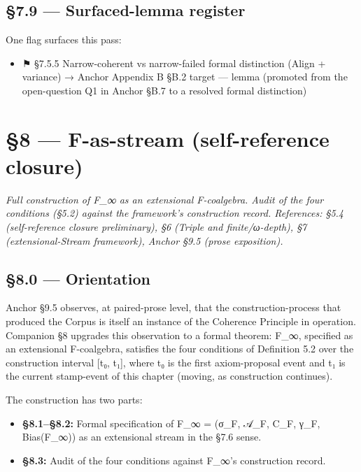 \documentclass[11pt, openany]{book}
\newcommand{\sectionbreak}{\clearpage}
\begin{document}
\sectionbreak

\section{§7.9 --- Surfaced-lemma register}

One flag surfaces this pass:

\begin{itemize}
\item ⚑ §7.5.5 Narrow-coherent vs narrow-failed formal distinction (Align + variance) → Anchor Appendix B §B.2 target --- lemma (promoted from the open-question Q1 in Anchor §B.7 to a resolved formal distinction)
\end{itemize}

\sectionbreak


\chapter{§8 — F-as-stream (self-reference closure)}


\textit{Full construction of F\_\allowbreak{}∞ as an extensional F-coalgebra. Audit of the four conditions (§5.2) against the framework's construction record. References: §5.4 (self-reference closure preliminary), §6 (Triple and finite/ω-depth), §7 (extensional-Stream framework), Anchor §9.5 (prose exposition).}

\sectionbreak

\section{§8.0 --- Orientation}

Anchor §9.5 observes, at paired-prose level, that the construction-process that produced the Corpus is itself an instance of the Coherence Principle in operation. Companion §8 upgrades this observation to a formal theorem: F\_\allowbreak{}∞, specified as an extensional F-coalgebra, satisfies the four conditions of Definition 5.2 over the construction interval [t₀, t₁], where t₀ is the first axiom-proposal event and t₁ is the current stamp-event of this chapter (moving, as construction continues).

The construction has two parts:

\begin{itemize}
\item \textbf{§8.1–§8.2:} Formal specification of F\_\allowbreak{}∞ = (σ\_\allowbreak{}F, 𝒜\_\allowbreak{}F, C\_\allowbreak{}F, γ\_\allowbreak{}F, Bias(F\_\allowbreak{}∞)) as an extensional stream in the §7.6 sense.
\item \textbf{§8.3:} Audit of the four conditions against F\_\allowbreak{}∞'s construction record.
\end{itemize}
\end{document}
